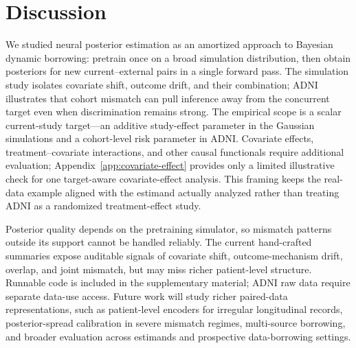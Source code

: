 \section{Discussion}
\label{sec:discussion}

We studied neural posterior estimation as an amortized approach to Bayesian
dynamic borrowing: pretrain once on a broad simulation distribution, then obtain
posteriors for new current--external pairs in a single forward pass. The
simulation study isolates covariate shift, outcome drift, and their combination;
ADNI illustrates that cohort mismatch can pull inference away from the
concurrent target even when discrimination remains strong. The empirical scope
is a scalar current-study target---an additive study-effect parameter in the
Gaussian simulations and a cohort-level risk parameter in ADNI. Covariate
effects, treatment--covariate interactions, and other causal functionals require
additional evaluation; Appendix~\ref{app:covariate-effect} provides only a
limited illustrative check for one target-aware covariate-effect analysis. This
framing keeps the real-data example aligned with the estimand actually analyzed
rather than treating ADNI as a randomized treatment-effect study.

Posterior quality depends on the pretraining simulator, so mismatch patterns
outside its support cannot be handled reliably. The current hand-crafted
summaries expose auditable signals of covariate shift, outcome-mechanism drift,
overlap, and joint mismatch, but may miss richer patient-level structure.
Runnable code is included in the supplementary material; ADNI raw data require
separate data-use access. Future work will study richer paired-data
representations, such as patient-level encoders for irregular longitudinal
records, posterior-spread calibration in severe mismatch regimes, multi-source
borrowing, and broader evaluation across estimands and prospective
data-borrowing settings.
